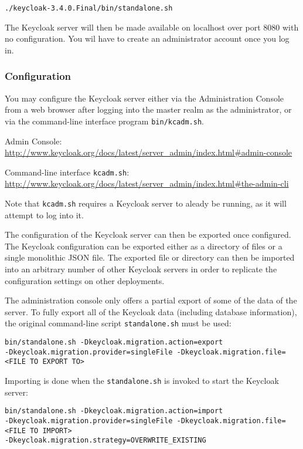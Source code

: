 \documentclass{article}
\begin{document}
\begin{verbatim}
./keycloak-3.4.0.Final/bin/standalone.sh
\end{verbatim}

The Keycloak server will then be made available on localhost over port 8080
with no configuration. You wil have to create an administrator account once you log in.

\subsubsection{Configuration}

You may configure the Keycloak server either via the Administration Console
from a web browser after logging into the master realm as the administrator,
or via the command-line interface program \texttt{bin/kcadm.sh}.

Admin Console:
\url{http://www.keycloak.org/docs/latest/server_admin/index.html#admin-console}

Command-line interface \texttt{kcadm.sh}:
\url{http://www.keycloak.org/docs/latest/server_admin/index.html#the-admin-cli}

Note that \texttt{kcadm.sh} requires a Keycloak server to aleady be running,
as it will attempt to log into it.

The configuration of the Keycloak server can then be exported once
configured. The Keycloak configuration can be exported either as a directory of files or a single monolithic JSON file. The exported file or directory can then be imported into an arbitrary number of other Keycloak servers in order to replicate the configuration settings on other deployments.

The administration console only offers a partial export of some of the data of the server. To fully export all of the Keycloak data (including database information), the original command-line script \texttt{standalone.sh} must be used:

\begin{verbatim}
bin/standalone.sh -Dkeycloak.migration.action=export
-Dkeycloak.migration.provider=singleFile -Dkeycloak.migration.file=<FILE TO EXPORT TO>
\end{verbatim}

Importing is done when the \texttt{standalone.sh} is invoked to start the Keycloak server:

\begin{verbatim}
bin/standalone.sh -Dkeycloak.migration.action=import
-Dkeycloak.migration.provider=singleFile -Dkeycloak.migration.file=<FILE TO IMPORT>
-Dkeycloak.migration.strategy=OVERWRITE_EXISTING
\end{verbatim}
\end{document}
